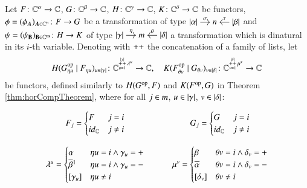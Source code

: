 \begin{definition}\label{def:generalHorizontalCompositionDef}
	Let $F \colon \mathbb C^\alpha \to \mathbb C$, $G \colon \mathbb C^\beta \to \mathbb C$, $H \colon \mathbb C^\gamma \to \mathbb C$, $K \colon \mathbb C^\delta \to \mathbb C$ be functors, $\fst = (\fst_\bfA)_{\bfA \in \C^n} \colon \fstDom \to \fstCoDom$ be a transformation of type
	$
	\begin{tikzcd}[cramped,sep=small]
	\length\fstDomVar \ar[r,"\fstTypL"] & \fstVarNo & \length\fstCoDomVar \ar[l,"\fstTypR"']
	\end{tikzcd}
	$
	and $\psi = (\psi_{\bf B})_{\bf B \in \mathbb C^m}\colon H \to K$ of type
	$
	\begin{tikzcd}[cramped,sep=small]
	\length\sndDomVar \ar[r,"\sndTypL"] & \sndVarNo & \length\sndCoDomVar \ar[l,"\sndTypR"']
	\end{tikzcd}
	$
	a transformation which is dinatural in its $i$-th variable. 
	Denoting with $\mathop{++}\limits$ the concatenation of a family of lists, let
	\[
	H ({G_{\eta u}^{\text{op}}} \mid {F_{\eta u}} )_{u \in \lvert \gamma \rvert}  \colon \mathbb C^{{\mathop{++}\limits_{u=1}^{\lvert \gamma \rvert} \lambda^u}} \to \mathbb C, \quad K ({F_{\theta v}^{\text{op}}} \mid {G_{\theta v}} )_{v \in \lvert \delta \rvert} \colon \mathbb C^{\mathop{++}\limits_{v=1}^{\lvert \delta \rvert}\mu^v} \to \mathbb C
	\]	
	be functors, defined similarly to $H(G^{\text{op}} , F)$ and  $K(F^{\text{op}},G)$ in Theorem \ref{thm:horCompTheorem}, where for all $j \in m$, $u \in\lvert \gamma \rvert$, $v\in\lvert \delta \rvert$:
	\[	
	\begin{tikzcd}[ampersand replacement=\&,row sep=.5em]
		\F_j= 
		\begin{cases}
		F & j=i \\
		\id\C & j \ne i
		\end{cases}
		\& \G_j= 
		\begin{cases}
		G & j=i \\
		\id\C & j \ne i
		\end{cases}
		\\
		\lambda^u = \begin{cases}
		\alpha & \eta u = i \land \gamma_u=+ \\
		\Not\beta\footnotemark & \eta u = i \land \gamma_u = - \\
		[\gamma_u] & \eta u \ne i
		\end{cases}
		\& \mu^v = \begin{cases}
		\beta & \theta v = i \land \delta_v=+ \\
		\Not\alpha & \theta v = i \land \delta_v = - \\
		[\delta_v] & \theta v \ne i
		\end{cases}
	\end{tikzcd}
\]
\end{definition}
